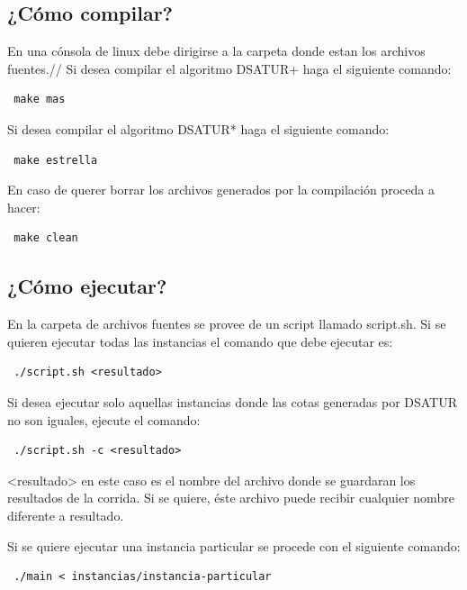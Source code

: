 \documentclass[a4paper,10pt]{article}
\begin{document}
\subsection{¿Cómo compilar?}
En una cónsola de linux debe dirigirse a la carpeta donde estan los
archivos fuentes.//
\indent Si desea compilar el algoritmo DSATUR+ haga el siguiente comando:
\begin{verbatim}
 make mas
\end{verbatim}

\indent Si desea compilar el algoritmo DSATUR* haga el siguiente comando:
\begin{verbatim}
 make estrella
\end{verbatim}

En caso de querer borrar los archivos generados por la compilación
proceda a hacer:
\begin{verbatim}
 make clean
\end{verbatim}

\subsection{¿Cómo ejecutar?}
En la carpeta de archivos fuentes se provee de un script llamado
script.sh. Si se quieren ejecutar todas las instancias el comando que
debe ejecutar es:
\begin{verbatim}
 ./script.sh <resultado>
\end{verbatim}

Si desea ejecutar solo aquellas instancias donde las cotas generadas por
DSATUR no son iguales, ejecute el comando:
\begin{verbatim}
 ./script.sh -c <resultado>
\end{verbatim}

<resultado> en este caso es el nombre del archivo donde se guardaran los
resultados de la corrida. Si se quiere, éste archivo puede recibir
cualquier nombre diferente a resultado.

Si se quiere ejecutar una instancia particular se procede con el
siguiente comando:

\begin{verbatim}
 ./main < instancias/instancia-particular
\end{verbatim}

\newpage
\end{document}
